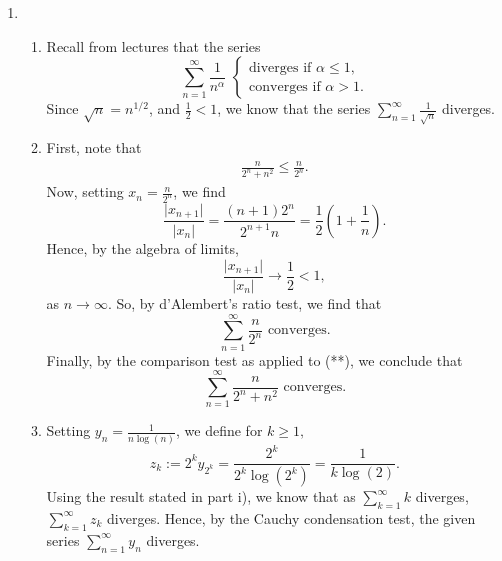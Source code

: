 \documentclass[
  12pt,
  a4paper]{extarticle}
\providecommand{\tightlist}{%
  \setlength{\itemsep}{0pt}\setlength{\parskip}{0pt}}
\theoremstyle{plain}
\theoremstyle{definition}
\theoremstyle{plain}
\theoremstyle{plain}
\theoremstyle{plain}
\theoremstyle{plain}
\theoremstyle{definition}
\theoremstyle{definition}
\newtheorem*{Order Axioms*}{Order Axioms}\newtheorem{Order Axioms}{Order Axioms}[section]
\theoremstyle{remark}
\theoremstyle{remark}
\renewcommand{\;}{\,}
\begin{document}
\begin{enumerate}
\begin{enumerate}
  \end{enumerate}
\item
  \begin{enumerate}
  \def\labelenumii{\roman{enumii})}
  \tightlist
  \item
    Recall from lectures that the series \[\sum_{n=1}^{\infty} \frac{1}{n^{\alpha}}\;\;\begin{cases}\text{diverges if}\;\; \alpha \leq 1,\\
    \text{converges if}\;\; \alpha > 1.
    \end{cases}\] Since \(\sqrt{n} = n^{1/2}\), and \(\frac{1}{2}<1\), we know that the series \(\sum_{n=1}^{\infty}\frac{1}{\sqrt{n}}\) diverges.
  \item
    First, note that
    \begin{align}
    \frac{n}{2^n + n^2} \leq \frac{n}{2^n}.\tag{**}
    \end{align}
    Now, setting \(x_n = \frac{n}{2^n}\), we find \[\frac{\lvert x_{n+1}\rvert}{\lvert x_n \rvert} = \frac{(n+1)2^n}{2^{n+1}n} = \frac{1}{2}\left(1 + \frac{1}{n}\right).\] Hence, by the algebra of limits, \[\frac{\lvert x_{n+1}\rvert}{\lvert x_n \rvert} \to \frac{1}{2} < 1,\] as \(n \to \infty\). So, by d'Alembert's ratio test, we find that \[\sum_{n=1}^{\infty}\frac{n}{2^n} \; \; \text{converges.}\] Finally, by the comparison test as applied to (**), we conclude that \[\sum_{n=1}^{\infty}\frac{n}{2^n + n^2} \; \; \text{converges.}\]
  \item
    Setting \(y_n = \frac{1}{n\log(n)}\), we define for \(k \geq 1,\) \[z_{k}:= 2^k y_{2^k} = \frac{2^k}{2^k\log(2^k)} = \frac{1}{k\log(2)}.\] Using the result stated in part i), we know that as \(\sum_{k=1}^{\infty}k\) diverges, \(\sum_{k=1}^{\infty} z_k\) diverges. Hence, by the Cauchy condensation test, the given series \(\sum_{n=1}^{\infty}y_n\) diverges.
  \end{enumerate}
\end{enumerate}
\end{document}
